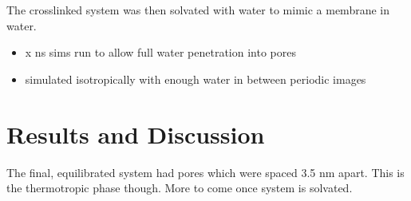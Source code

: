 \documentclass{article}
\begin{document}
\noindent The crosslinked system was then solvated with water to mimic a membrane in water.
\begin{itemize}
	\item x ns sims run to allow full water penetration into pores
	\item simulated isotropically with enough water in between periodic images
\end{itemize}  
 
\section{Results and Discussion}

The final, equilibrated system had pores which were spaced 3.5 nm apart. This is the thermotropic phase though. More to come once system is solvated. 
\end{document}
